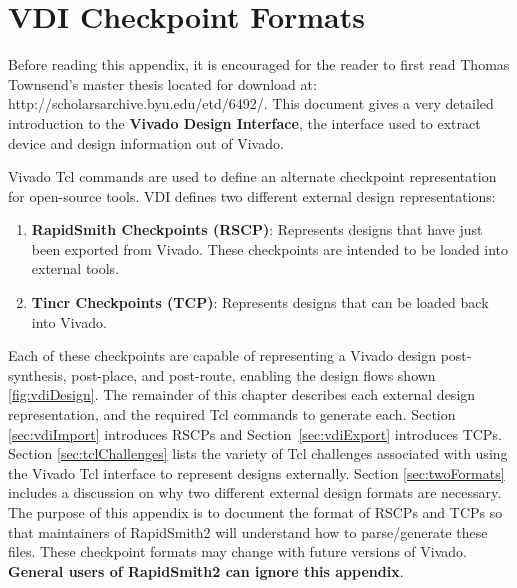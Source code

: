 \newpage
\section{VDI Checkpoint Formats} \label{sec:rscpTcp}
\graphicspath{{./techReportFigures/appendixD/} {./techReportFigures/sec5_designs/}}

Before reading this appendix, it is encouraged for the reader to first read
Thomas Townsend's master thesis located for download at: {\color{blue}
http://scholarsarchive.byu.edu/etd/6492/}. This document gives a very detailed
introduction to the \textbf{Vivado Design Interface}, the interface used to
extract device and design information out of Vivado. 

\vspace{.3cm}

Vivado Tcl commands are used to define an alternate checkpoint representation
for open-source tools. VDI defines two different external design
representations:

\begin{enumerate}
  \item \textbf{RapidSmith Checkpoints (RSCP)}: Represents designs that have
  just been exported from Vivado. These checkpoints are intended to be loaded
  into external tools.
  \item \textbf{Tincr Checkpoints (TCP)}: Represents designs
  that can be loaded back into Vivado.
\end{enumerate}

\noindent Each of these checkpoints are capable of representing a Vivado design
post-synthesis, post-place, and post-route, enabling the design flows shown 
\autoref{fig:vdiDesign}. The remainder of this chapter describes each external
design representation, and the required Tcl commands to generate each.
Section \ref{sec:vdiImport} introduces RSCPs and Section~\ref{sec:vdiExport} introduces
TCPs. Section \ref{sec:tclChallenges} lists the variety of Tcl challenges
associated with using the Vivado Tcl interface to represent designs externally.
Section \ref{sec:twoFormats} includes a discussion on why two different external
design formats are necessary. The purpose of this appendix is to document the
format of RSCPs and TCPs so that maintainers of RapidSmith2 will understand how
to parse/generate these files. These checkpoint formats may change with future
versions of Vivado. \textbf{General users of RapidSmith2 can ignore this
appendix}.

